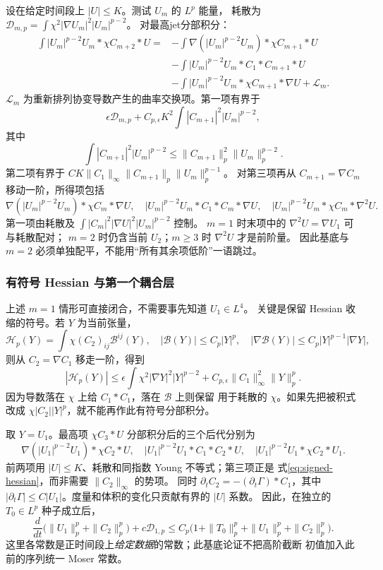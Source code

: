 \documentclass[UTF8,a4paper,11pt,fontset=fandol]{ctexart}
\numberwithin{equation}{section}
\theoremstyle{definition}
\begin{document}
设在给定时间段上 $|U|\le K$。测试 $U_m$ 的 $L^p$ 能量，
耗散为 $\mathcal D_{m,p}=\int\chi^2|\nabla U_m|^2|U_m|^{p-2}$。
对最高jet分部积分：
\begin{align*}
\int |U_m|^{p-2}U_m*\chi C_{m+2}*U
={}&-\int\nabla(|U_m|^{p-2}U_m)*\chi C_{m+1}*U\\
&-\int|U_m|^{p-2}U_m*C_1*C_{m+1}*U\\
&-\int|U_m|^{p-2}U_m*\chi C_{m+1}*\nabla U
+\mathcal L_m .
\end{align*}
$\mathcal L_m$ 为重新排列协变导数产生的曲率交换项。第一项有界于
\[
\epsilon\mathcal D_{m,p}
+C_{p,\epsilon}K^2\int|C_{m+1}|^2|U_m|^{p-2},
\]
其中
\[
\int|C_{m+1}|^2|U_m|^{p-2}
\le\|C_{m+1}\|_p^2\|U_m\|_p^{p-2}.
\]
第二项有界于 $CK\|C_1\|_\infty\|C_{m+1}\|_p\|U_m\|_p^{p-1}$。
对第三项再从 $C_{m+1}=\nabla C_m$ 移动一阶，所得项包括
\[
\nabla(|U_m|^{p-2}U_m)*\chi C_m*\nabla U,\quad
|U_m|^{p-2}U_m*C_1*C_m*\nabla U,\quad
|U_m|^{p-2}U_m*\chi C_m*\nabla^2U.
\]
第一项由耗散及 $\int|C_m|^2|\nabla U|^2|U_m|^{p-2}$ 控制。
$m=1$ 时末项中的 $\nabla^2U=\nabla U_1$ 可与耗散配对；
$m=2$ 时仍含当前 $U_2$；$m\ge3$ 时 $\nabla^2U$ 才是前阶量。
因此基底与 $m=2$ 必须单独配平，不能用“所有其余项低阶”一语跳过。

\subsubsection{有符号 Hessian 与第一个耦合层}\label{sec:jet-base-pair}
上述 $m=1$ 情形可直接闭合，不需要事先知道 $U_1\in L^4$。
关键是保留 Hessian 收缩的符号。若 $Y$ 为当前张量，
\[
\mathcal H_p(Y)=\int\chi(C_2)_{ij}\mathcal B^{ij}(Y),\quad
|\mathcal B(Y)|\le C_p|Y|^p,\quad
|\nabla\mathcal B(Y)|\le C_p|Y|^{p-1}|\nabla Y|,
\]
则从 $C_2=\nabla C_1$ 移走一阶，得到
\begin{equation}\label{eq:signed-hessian}
|\mathcal H_p(Y)|\le
\epsilon\int\chi^2|\nabla Y|^2|Y|^{p-2}
+C_{p,\epsilon}\|C_1\|_\infty^2\|Y\|_p^p.
\end{equation}
因为导数落在 $\chi$ 上给 $C_1*C_1$，落在 $\mathcal B$ 上则保留
用于耗散的 $\chi$。如果先把被积式改成
$\chi|C_2||Y|^p$，就不能再作此有符号分部积分。

取 $Y=U_1$。最高项 $\chi C_3*U$ 分部积分后的三个后代分别为
\[
\nabla(|U_1|^{p-2}U_1)*\chi C_2*U,\quad
|U_1|^{p-2}U_1*C_1*C_2*U,\quad
|U_1|^{p-2}U_1*\chi C_2*U_1.
\]
前两项用 $|U|\le K$、耗散和同指数 Young 不等式；第三项正是
式\eqref{eq:signed-hessian}，而非需要 $\|C_2\|_\infty$ 的势项。
同时 $\partial_tC_2=-(\partial_t\Gamma)*C_1$，其中
$|\partial_t\Gamma|\le C|U_1|$。度量和体积的变化只贡献有界的 $|U|$ 系数。
因此，在独立的 $T_0\in L^p$ 种子成立后，
\begin{equation}\label{eq:first-coupled-energy}
\frac d{dt}\bigl(\|U_1\|_p^p+\|C_2\|_p^p\bigr)
+c\mathcal D_{1,p}
\le C_p\bigl(1+\|T_0\|_p^p+\|U_1\|_p^p+\|C_2\|_p^p\bigr).
\end{equation}
这里各常数是正时间段上\emph{给定数据}的常数；此基底论证不把高阶截断
初值加入此前的序列统一 Moser 常数。
\end{document}
